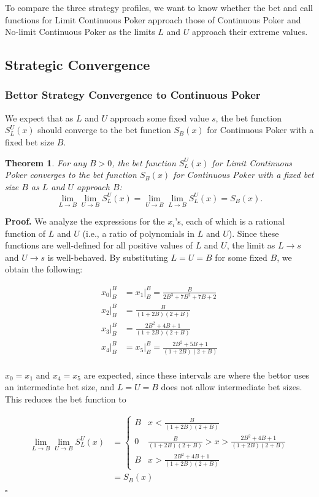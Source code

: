 \documentclass[a4paper,12pt]{article}
\theoremstyle{plain}
\newtheorem{theorem}{Theorem}[section]
\theoremstyle{definition}
\newenvironment{customproof}[1][Proof]{\noindent\textbf{#1.} }{\hfill$\square$\vspace{1em}}
\begin{document}
To compare the three strategy profiles, we want to know whether the bet and call functions for Limit Continuous Poker approach those of Continuous Poker and No-limit Continuous Poker as the limits $L$ and $U$ approach their extreme values.

\subsection{Strategic Convergence}

\subsubsection{Bettor Strategy Convergence to Continuous Poker}
We expect that as $L$ and $U$ approach some fixed value $s$, the bet function $S_L^U(x)$ should converge to the bet function $S_B(x)$ for Continuous Poker with a fixed bet size $B$. 

\begin{theorem}
	 For any $B > 0$, the bet function $S_L^U(x)$ for Limit Continuous Poker converges to the bet function $S_B(x)$ for Continuous Poker with a fixed bet size $B$ as $L$ and $U$ approach $B$:
\[
\lim_{L \to B} \lim_{U \to B} S_L^U(x) = \lim_{U \to B} \lim_{L \to B} S_L^U(x) = S_B(x).
\]
\end{theorem}

\begin{customproof}
We analyze the expressions for the $x_i$'s, each of which is a rational function of $L$ and $U$ (i.e., a ratio of polynomials in $L$ and $U$). Since these functions are well-defined for all positive values of $L$ and $U$, the limit as $L \to s$ and $U \to s$ is well-behaved. By substituting $L = U = B$ for some fixed $B$, we obtain the following:

\begin{align*}
    x_0|_B^B & = x_1|_B^B = \frac{B}{2 B^3+7 B^2+7 B+2} \\
    x_2|_B^B & = \frac{B}{(1+2B)(2+B)} \\
    x_3|_B^B & = \frac{2 B^2+4 B+1}{(1+2B)(2+B)} \\
    x_4|_B^B & = x_5|_B^B = \frac{2 B^2+5 B+1}{(1+2B)(2+B)} \\
\end{align*}

$x_0 = x_1$ and $x_4 = x_5$ are expected, since these intervals are where the bettor uses an intermediate bet size, and $L=U=B$ does not allow intermediate bet sizes. This reduces the bet function to 

\begin{align*}
    \lim_{L \to B} \lim_{U \to B} S_L^U(x) & = \begin{cases}
    B & x < \frac{B}{(1+2B)(2+B)}\\
    0 & \frac{B}{(1+2B)(2+B)} > x > \frac{2 B^2+4 B+1}{(1+2B)(2+B)}\\
    B & x > \frac{2 B^2+4 B+1}{(1+2B)(2+B)}
    \end{cases}\\
    &= S_B(x)
\end{align*}
\end{customproof}
\end{document}
